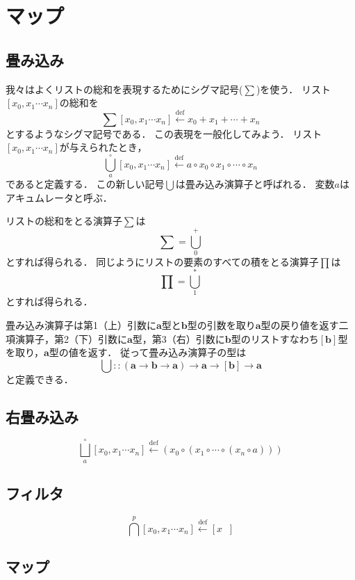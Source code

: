 \documentclass[twocolumn]{jsbook}
\newcommand{\defeq}{\xleftarrow{\text{def}}}
\newcommand{\filterfunc}{\bigcap} %
\newcommand{\foldfunc}{\bigcup} %
\newcommand{\foldrightfunc}{\bigsqcup} %
\newcommand{\guard}[1]{\mathop{\mid_{{#1}}}}
\newcommand{\truevalue}{\text{T}}
\newcommand{\typename}[1]{\bm{#1}}
\newcommand{\listtype}[1]{\left[#1\right]}
\begin{document}
\chapter{マップ}

\section{畳み込み}

我々はよくリストの総和を表現するためにシグマ記号($\sum$)を使う．
リスト$\listtype{x_0,x_1\dotsb x_n}$の総和を$$\sum\listtype{x_0,x_1\dotsb x_n}\defeq x_0+x_1+\dotsb+x_n$$とするようなシグマ記号である．
この表現を一般化してみよう．
リスト$\listtype{x_0,x_1\dotsb x_n}$が与えられたとき，$$\foldfunc^\circ_a\listtype{x_0,x_1\dotsb x_n}\defeq a\circ x_0\circ x_1\circ\dotsb\circ x_n$$であると定義する．
この新しい記号$\foldfunc$は畳み込み演算子と呼ばれる．
変数$a$はアキュムレータと呼ぶ．

リストの総和をとる演算子$\sum$は$$\sum=\foldfunc^+_0$$とすれば得られる．
同じようにリストの要素のすべての積をとる演算子$\prod$は$$\prod=\foldfunc^\ast_1$$とすれば得られる．

畳み込み演算子は第1（上）引数に$\typename{a}$型と$\typename{b}$型の引数を取り$\typename{a}$型の戻り値を返す二項演算子，第2（下）引数に$\typename{a}$型，第3（右）引数に$\typename{b}$型のリストすなわち$\listtype{\typename{b}}$型を取り，$\typename{a}$型の値を返す．
従って畳み込み演算子の型は$$\foldfunc::(\typename{a}\rightarrow\typename{b}\rightarrow\typename{a})\rightarrow\typename{a}\rightarrow\listtype{\typename{b}}\rightarrow\typename{a}$$と定義できる．

\section{右畳み込み}

$$\foldrightfunc_a^\circ\listtype{x_0,x_1\dotsb x_n}\defeq\left(x_0\circ\left(x_1\circ\dotsb\circ\left(x_n\circ a\right)\right)\right)$$

\section{フィルタ}

$$\filterfunc^p\listtype{x_0,x_1\dotsb x_n}\defeq\listtype{x\guard{x\in\listtype{x_0,x_1\dotsb x_n},\,px\equiv\truevalue}}$$

\section{マップ}
\end{document}
